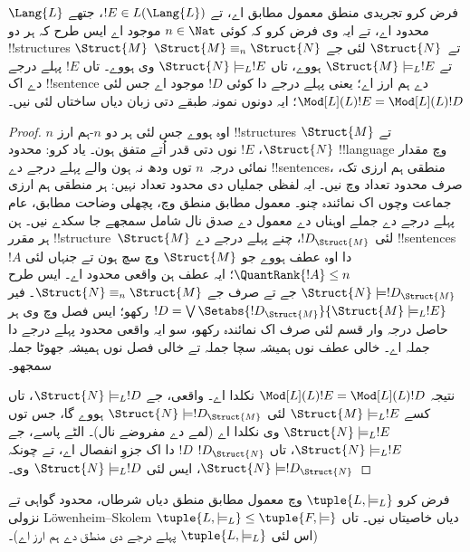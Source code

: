 \documentclass[../../../include/open-logic-section]{subfiles}
\begin{document}


\begin{lem}
فرض کرو تجریدی منطق معمول مطابق اے، تے $!E \in L(\Lang{L})$، جتھے $\Lang{L}$ محدود
اے، تے ایہ وی فرض کرو کہ کوئی $n \in \Nat$ موجود اے
ایس طرح کہ ہر دو !!{structure}s $\Struct{M}$ تے~$\Struct{N}$
لئی جے $\Struct{M} \equiv_n
\Struct{N}$ تے $\Struct{M} \models_L !E$ ہووے، تاں
$\Struct{N}
\models_L !E$ وی ہووے۔ تاں $!E$ پہلے درجے دے اک
!!{sentence} دے ہم ارز اے؛ یعنی پہلے درجے دا کوئی $!D$
موجود اے جس لئی $\Mod[L](L){!E} = \Mod[L](L){!D}$؛
ایہ دونوں نمونہ طبقے دتی زبان دیاں ساختاں لئی نیں۔
\end{lem}

\begin{proof} 
$n$ اوہ ہووے جس لئی ہر دو $n$-ہم ارز !!{structure}s
$\Struct{M}$ تے $\Struct{N}$، $!E$ نوں دتی قدر اُتے
متفق ہون۔  یاد کرو:
محدود !!{language} وچ مقدار نمائی درجہ~$n$ توں
ودھ نہ ہون والے پہلے درجے دے !!{sentence}s، منطقی
ہم ارزی تک، صرف محدود تعداد وچ نیں۔ ایہ لفظی جملیاں دی محدود
تعداد نہیں: ہر منطقی ہم ارزی جماعت وچوں اک نمائندہ چنو۔ معمول
مطابق منطق وچ، پچھلی وضاحت مطابق، عام پہلے درجے دے جملے اوہناں
دے معمول دے صدق نال شامل سمجھے جا سکدے نیں۔ ہن ہر مقرر
!!{structure}~$\Struct{M}$ لئی $!D_{\Struct{M}}$،
چنے پہلے درجے دے !!{sentence}s~$!A$ دا اوہ عطف
ہووے جو $\Struct{M}$ وچ سچ ہون تے جنہاں لئی
$\QuantRank{!A} \le n$؛ ایہ عطف ہن واقعی محدود اے۔ ایس طرح
$\Struct{N} \models !D_{\Struct{M}}$ جے تے صرف جے
$\Struct{N}
\equiv_n \Struct{M}$۔ فیر $!D = \textstyle\bigvee
\Setabs{!D_{\Struct{M}}}{\Struct{M} \models_L !E}$
رکھو؛ ایس فصل وچ وی ہر حاصل درجہ وار قسم لئی صرف اک
نمائندہ رکھو، سو ایہ واقعی محدود پہلے درجے دا جملہ اے۔ خالی
عطف نوں ہمیشہ سچا جملہ تے خالی فصل نوں ہمیشہ جھوٹا جملہ سمجھو۔

نتیجہ $\Mod[L](L){!E} = \Mod[L](L){!D}$ نکلدا اے۔
واقعی، جے $\Struct{N} \models_L !D$، تاں کسے
$\Struct{M} \models_L
!E$ لئی $\Struct{N} \models !D_{\Struct{M}}$ ہووے گا،
جس توں $\Struct{N} \models_L !E$ وی نکلدا اے
(لمے دے مفروضے نال)۔ الٹے پاسے، جے
$\Struct{N} \models_L !E$، تاں $!D_\Struct{N}$
$!D$ دا اک جزوِ انفصال اے، تے چونکہ
$\Struct{N}
\models !D_\Struct{N}$، ایس لئی
$\Struct{N} \models_L !D$ وی۔
\end{proof}

\begin{thm}
   فرض کرو $\tuple{L, \models_L}$ وچ
  معمول مطابق منطق دیاں شرطاں، محدود گواہی تے نزولی
  L\"owenheim--Skolem دیاں خاصیتاں نیں۔ تاں
  $\tuple{L, \models_L} \le \tuple{F, \models}$ (اس لئی
  $\tuple{L, \models_L}$ پہلے درجے دی منطق دے ہم ارز اے)۔
\end{thm}
\end{document}
